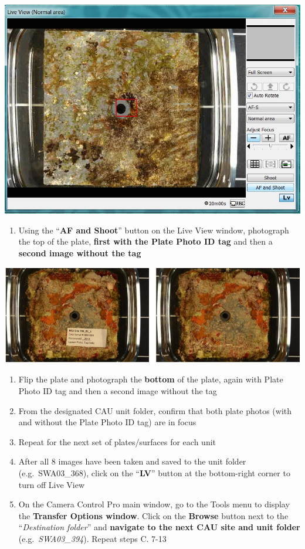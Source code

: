 \documentclass[
]{book}
\providecommand{\tightlist}{%
  \setlength{\itemsep}{0pt}\setlength{\parskip}{0pt}}
\begin{document}
\includegraphics{images/Camera15.jpg}

\begin{enumerate}
\def\labelenumi{\arabic{enumi}.}
\setcounter{enumi}{10}
\tightlist
\item
  Using the ``\textbf{AF and Shoot}'' button on the Live View window, photograph the top of the plate, \textbf{first with the Plate Photo ID tag} and then a \textbf{second image without the tag}
\end{enumerate}

\includegraphics{images/CAU_image.jpg}

\begin{enumerate}
\def\labelenumi{\arabic{enumi}.}
\setcounter{enumi}{11}
\item
  Flip the plate and photograph the \textbf{bottom} of the plate, again with Plate Photo ID tag and then a second image without the tag
\item
  From the designated CAU unit folder, confirm that both plate photos (with and without the Plate Photo ID tag) are in focus
\item
  Repeat for the next set of plates/surfaces for each unit
\item
  After all 8 images have been taken and saved to the unit folder (e.g.~SWA03\_368), click on the ``\textbf{LV}'' button at the bottom-right corner to turn off Live View
\item
  On the Camera Control Pro main window, go to the Tools menu to display the \textbf{Transfer Options window}. Click on the \textbf{Browse} button next to the ``\emph{Destination folder}'' and \textbf{navigate to the next CAU site and unit folder} (e.g.~\emph{SWA03\_394}). Repeat steps C. 7-13
\end{enumerate}
\end{document}
